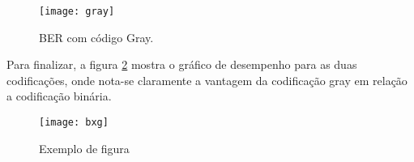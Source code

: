 \begin{figure}[H]
    \centering
    \texttt{[image: gray]}
    \caption{BER com código Gray.}
    \label{fig:gray}
\end{figure}


Para finalizar, a figura \ref{fig:bxg} mostra o gráfico de desempenho para as duas codificações, onde nota-se claramente a vantagem da codificação gray em relação a codificação binária.

\begin{figure}[H]
    \centering
    \texttt{[image: bxg]}
    \caption{Exemplo de figura}
    \label{fig:bxg}
\end{figure}